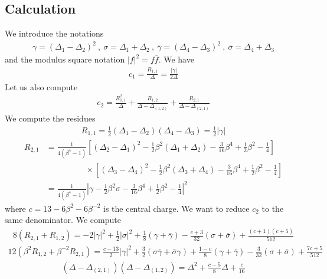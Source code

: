 \documentclass[12pt,a4paper]{article}
\begin{document}
\subsection{Calculation}

We introduce the notations 
\begin{align}
 \gamma = (\Delta_1-\Delta_2)^2 \ , \ \sigma = \Delta_1+\Delta_2 \ , \ \bar\gamma = (\Delta_4-\Delta_3)^2 \ , \ \bar\sigma = \Delta_4+\Delta_3 
\end{align}
and the modulus square notation $|f|^2 = f\bar f$. 
We have 
\begin{align}
 c_1 = \frac{R_{1,1}}{\Delta} = \frac{|\gamma|}{2\Delta}
\end{align}
Let us also compute 
\begin{align}
 c_2 = \frac{R_{1,1}^2}{\Delta} +\frac{R_{1,2}}{\Delta-\Delta_{(1,2)}} + \frac{R_{2,1}}{\Delta-\Delta_{(2,1)}}
\end{align}
We compute the residues 
\begin{align}
 R_{1,1} = \tfrac12 (\Delta_1-\Delta_2)(\Delta_4-\Delta_3)  = \tfrac12 |\gamma| 
 \end{align}
 \begin{align}
   R_{2,1} &= \frac{1}{4(\beta^4-1)}\left[(\Delta_2-\Delta_1)^2 -\tfrac12 \beta^2(\Delta_1+\Delta_2) -\tfrac{3}{16}\beta^4+\tfrac12\beta^2-\tfrac14\right] 
   \\
 & \hspace{2cm} \times \left[(\Delta_3-\Delta_4)^2 -\tfrac12 \beta^2(\Delta_3+\Delta_4) -\tfrac{3}{16}\beta^4+\tfrac12\beta^2-\tfrac14\right] 
 \\
  &= \frac{1}{4(\beta^4-1)}\left|\gamma -\tfrac12 \beta^2 \sigma -\tfrac{3}{16}\beta^4+\tfrac12\beta^2-\tfrac14\right|^2 
 \end{align}
 where $c=13-6\beta^2-6\beta^{-2}$ is the central charge. 
We want to reduce $c_2$ to the same denominator. We compute 
\begin{align}
 8(R_{2,1}+R_{1,2})= -2 |\gamma|^2 +\tfrac{1}{2}|\sigma|^2
 +\tfrac{1}{8} (\gamma+\bar\gamma) -\tfrac{c+3}{32}(\sigma+\bar\sigma) + \tfrac{(c+1)(c+5)}{512}
\end{align}
\begin{align}
 12(\beta^2R_{1,2}+\beta^{-2}R_{2,1}) = \tfrac{c-13}{2}|\gamma|^2 +\tfrac32(\sigma\bar\gamma+\bar\sigma\gamma)+\tfrac{1-c}{8}(\gamma+\bar\gamma) -\tfrac{3}{32}(\sigma+\bar\sigma)+\tfrac{7c+5}{512}
\end{align}
\begin{align}
 (\Delta-\Delta_{(2,1)})(\Delta-\Delta_{(1,2)}) = \Delta^2 + \tfrac{c-5}{8}\Delta + \tfrac{c}{16}
\end{align}
\end{document}
